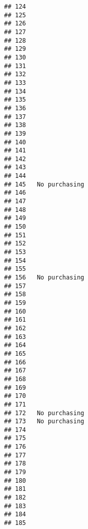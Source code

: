 \documentclass[
]{article}
\begin{document}
\begin{verbatim}
## 124                                   
## 125                                   
## 126                                   
## 127                                   
## 128                                   
## 129                                   
## 130                                   
## 131                                   
## 132                                   
## 133                                   
## 134                                   
## 135                                   
## 136                                   
## 137                                   
## 138                                   
## 139                                   
## 140                                   
## 141                                   
## 142                                   
## 143                                   
## 144                                   
## 145   No purchasing                   
## 146                                   
## 147                                   
## 148                                   
## 149                                   
## 150                                   
## 151                                   
## 152                                   
## 153                                   
## 154                                   
## 155                                   
## 156   No purchasing                   
## 157                                   
## 158                                   
## 159                                   
## 160                                   
## 161                                   
## 162                                   
## 163                                   
## 164                                   
## 165                                   
## 166                                   
## 167                                   
## 168                                   
## 169                                   
## 170                                   
## 171                                   
## 172   No purchasing                   
## 173   No purchasing                   
## 174                                   
## 175                                   
## 176                                   
## 177                                   
## 178                                   
## 179                                   
## 180                                   
## 181                                   
## 182                                   
## 183                                   
## 184                                   
## 185                                   

\end{verbatim}
\end{document}
